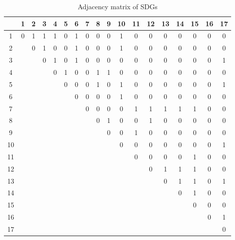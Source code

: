 \documentclass[11pt,a4paper,titlepage]{article}
\begin{document}
\begin{table}[h]
    \centering
    \renewcommand{\arraystretch}{1.2}
    \begin{tabular}{c|ccccccccccccccccc}
        & 1 & 2 & 3 & 4 & 5 & 6 & 7 & 8 & 9 & 10 & 11 & 12 & 13 & 14 & 15 & 16 & 17 \\ \hline
      1  & 0 & 1 & 1 & 1 & 0 & 1 & 0 & 0 & 0 & 1 & 0 & 0 & 0 & 0 & 0 & 0 & 0 \\
      2  &   & 0 & 1 & 0 & 0 & 1 & 0 & 0 & 0 & 1 & 0 & 0 & 0 & 0 & 0 & 0 & 0 \\
      3  &   &   & 0 & 1 & 0 & 1 & 0 & 0 & 0 & 0 & 0 & 0 & 0 & 0 & 0 & 0 & 1 \\
      4  &   &   &   & 0 & 1 & 0 & 0 & 1 & 1 & 0 & 0 & 0 & 0 & 0 & 0 & 0 & 0 \\
      5  &   &   &   &   & 0 & 0 & 0 & 1 & 0 & 1 & 0 & 0 & 0 & 0 & 0 & 0 & 1 \\
      6  &   &   &   &   &   & 0 & 0 & 0 & 0 & 1 & 0 & 0 & 0 & 0 & 0 & 0 & 0 \\
      7  &   &   &   &   &   &   & 0 & 0 & 0 & 0 & 1 & 1 & 1 & 1 & 1 & 0 & 0 \\
      8  &   &   &   &   &   &   &   & 0 & 1 & 0 & 0 & 1 & 0 & 0 & 0 & 0 & 0 \\
      9  &   &   &   &   &   &   &   &   & 0 & 0 & 1 & 0 & 0 & 0 & 0 & 0 & 0 \\
     10  &   &   &   &   &   &   &   &   &   & 0 & 0 & 0 & 0 & 0 & 0 & 0 & 1 \\
     11  &   &   &   &   &   &   &   &   &   &   & 0 & 0 & 0 & 0 & 1 & 0 & 0 \\
     12  &   &   &   &   &   &   &   &   &   &   &   & 0 & 1 & 1 & 1 & 0 & 0 \\
     13  &   &   &   &   &   &   &   &   &   &   &   &   & 0 & 1 & 1 & 0 & 1 \\
     14  &   &   &   &   &   &   &   &   &   &   &   &   &   & 0 & 1 & 0 & 0 \\
     15  &   &   &   &   &   &   &   &   &   &   &   &   &   &   & 0 & 0 & 0 \\
     16  &   &   &   &   &   &   &   &   &   &   &   &   &   &   &   & 0 & 1 \\
     17  &   &   &   &   &   &   &   &   &   &   &   &   &   &   &   &   & 0 \\
    \end{tabular}
    \caption{Adjacency matrix of SDGs}
\end{table}

\newpage


\end{document}

